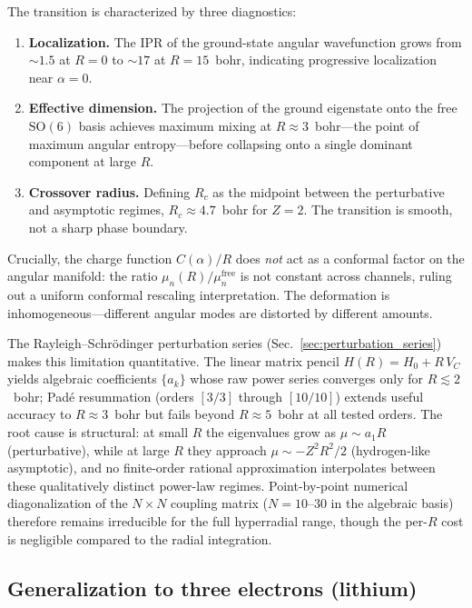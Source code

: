 \documentclass[aps,pra,twocolumn,superscriptaddress,longbibliography]{revtex4-2}
\begin{document}
The transition is characterized by three diagnostics:
\begin{enumerate}
  \item \textbf{Localization.}  The IPR of the ground-state
    angular wavefunction grows from $\sim\!1.5$ at $R = 0$ to
    $\sim\!17$ at $R = 15$~bohr, indicating progressive
    localization near $\alpha = 0$.

  \item \textbf{Effective dimension.}  The projection of the
    ground eigenstate onto the free $\mathrm{SO}(6)$ basis
    achieves maximum mixing at $R \approx 3$~bohr---the point
    of maximum angular entropy---before collapsing onto a single
    dominant component at large $R$.

  \item \textbf{Crossover radius.}  Defining $R_c$ as the
    midpoint between the perturbative and asymptotic regimes,
    $R_c \approx 4.7$~bohr for $Z = 2$.  The transition is
    smooth, not a sharp phase boundary.
\end{enumerate}

Crucially, the charge function $C(\alpha)/R$ does \emph{not} act
as a conformal factor on the angular manifold: the ratio
$\mu_n(R)/\mu_n^{\mathrm{free}}$ is not constant across channels,
ruling out a uniform conformal rescaling interpretation.  The
deformation is inhomogeneous---different angular modes are
distorted by different amounts.

The Rayleigh--Schr\"odinger perturbation series
(Sec.~\ref{sec:perturbation_series}) makes this limitation
quantitative.  The linear matrix pencil $H(R) = H_0 + R\,V_C$
yields algebraic coefficients $\{a_k\}$ whose raw power series
converges only for $R \lesssim 2$~bohr; Pad\'e resummation
(orders $[3/3]$ through $[10/10]$) extends useful accuracy to
$R \approx 3$~bohr but fails beyond $R \approx 5$~bohr at all
tested orders.  The root cause is structural: at small $R$ the
eigenvalues grow as $\mu \sim a_1 R$ (perturbative), while at
large $R$ they approach $\mu \sim -Z^2 R^2/2$ (hydrogen-like
asymptotic), and no finite-order rational approximation
interpolates between these qualitatively distinct power-law
regimes.  Point-by-point numerical diagonalization of the
$N \times N$ coupling matrix ($N = 10$--$30$ in the algebraic
basis) therefore remains irreducible for the full hyperradial
range, though the per-$R$ cost is negligible compared to the
radial integration.

\subsection{Generalization to three electrons (lithium)}
\label{sec:lithium}
\end{document}
